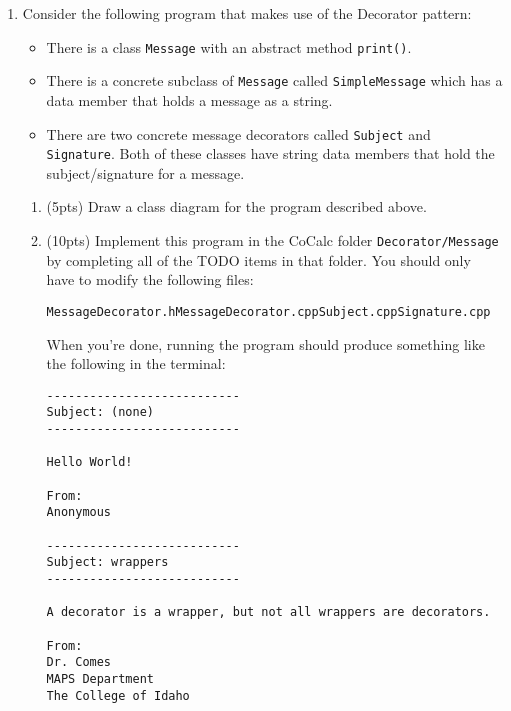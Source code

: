 \documentclass[11pt]{article}
\begin{document}
\begin{enumerate}
\begin{enumerate}
    \vspace{2.5in}


  \end{enumerate}

\newpage

  \item Consider the following program that makes use of the Decorator pattern:

  \begin{itemize}

    \item There is a class \texttt{Message} with an abstract method \texttt{print()}.

    \item There is a concrete subclass of \texttt{Message} called \texttt{SimpleMessage} which has a data member that holds a message as a string. 

    \item There are two concrete message decorators called \texttt{Subject} and \texttt{Signature}. Both of these classes have string data members that hold the subject/signature for a message. 

  \end{itemize} 

  \begin{enumerate}

  \item (5pts) Draw a class diagram for the program described above.

  \vfill

  \item (10pts) Implement this program in the CoCalc folder \texttt{Decorator/Message} by completing all of the TODO items in that folder. You should only have to modify the following files: 
  \begin{center}
  \texttt{MessageDecorator.h}\quad \texttt{MessageDecorator.cpp}\quad \texttt{Subject.cpp}\quad  \texttt{Signature.cpp}
  \end{center} 
  When you're done, running the program should produce something like the following in the terminal:

\begin{verbatim}
---------------------------
Subject: (none)
---------------------------

Hello World!

From: 
Anonymous

---------------------------
Subject: wrappers
---------------------------

A decorator is a wrapper, but not all wrappers are decorators.

From: 
Dr. Comes
MAPS Department
The College of Idaho
\end{verbatim}

  \end{enumerate}
\end{enumerate}
\end{document}
